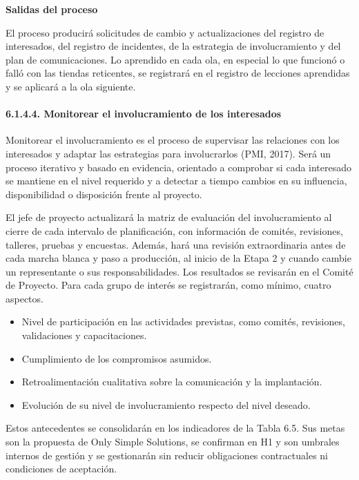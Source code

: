 \documentclass[11pt]{article}
\begin{document}
\textbf{Salidas del proceso}

El proceso producirá solicitudes de cambio y actualizaciones del
registro de interesados, del registro de incidentes, de la estrategia de
involucramiento y del plan de comunicaciones. Lo aprendido en cada ola,
en especial lo que funcionó o falló con las tiendas reticentes, se
registrará en el registro de lecciones aprendidas y se aplicará a la ola
siguiente.

\paragraph{6.1.4.4. Monitorear el involucramiento de los interesados}\label{6-1-4-4-monitorear-el-involucramiento-de-los-interesados}

Monitorear el involucramiento es el proceso de supervisar las relaciones con los interesados y adaptar las estrategias para involucrarlos (PMI, 2017). Será un proceso iterativo y basado en evidencia, orientado a comprobar si cada interesado se mantiene en el nivel requerido y a detectar a tiempo cambios en su influencia, disponibilidad o disposición frente al proyecto.

El jefe de proyecto actualizará la matriz de evaluación del
involucramiento al cierre de cada intervalo de planificación, con
información de comités, revisiones, talleres, pruebas y encuestas.
Además, hará una revisión extraordinaria antes de cada marcha blanca y
paso a producción, al inicio de la Etapa 2 y cuando cambie un
representante o sus responsabilidades. Los resultados se revisarán en el
Comité de Proyecto. Para cada grupo de interés se registrarán, como
mínimo, cuatro aspectos.

\begin{itemize}
\item
  Nivel de participación en las actividades previstas, como comités,
  revisiones, validaciones y capacitaciones.
\item
  Cumplimiento de los compromisos asumidos.
\item
  Retroalimentación cualitativa sobre la comunicación y la implantación.
\item
  Evolución de su nivel de involucramiento respecto del nivel deseado.
\end{itemize}

Estos antecedentes se consolidarán en los indicadores de la Tabla 6.5. Sus metas son la propuesta de Only Simple Solutions, se confirman en H1 y son umbrales internos de gestión y se
gestionarán sin reducir obligaciones contractuales ni condiciones de
aceptación.
\end{document}
